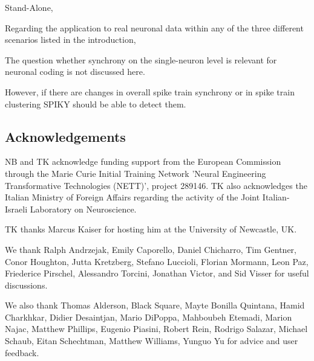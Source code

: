 \documentclass[10pt,twocolumn]{elsart5p}
\begin{document}
Stand-Alone, 

%

Regarding the application to real neuronal data within any of the three different scenarios listed in the introduction,

The question whether synchrony on the single-neuron level is relevant for neuronal coding is not discussed here.

However, if there are changes in overall spike train synchrony or in spike train clustering SPIKY should be able to detect them.


\vspace{1cm}

\begin{thanks}
\section{\label{s:Acknowledgement} \textbf{Acknowledgements}}

NB and TK acknowledge funding support from the European Commission through the Marie Curie Initial Training Network 'Neural Engineering Transformative Technologies (NETT)', project 289146. TK also acknowledges the Italian Ministry of Foreign Affairs regarding the activity of the Joint Italian-Israeli Laboratory on Neuroscience.

TK thanks Marcus Kaiser for hosting him at the University of Newcastle, UK.
     
We thank Ralph Andrzejak, Emily Caporello, Daniel Chicharro, Tim Gentner, Conor Houghton, Jutta Kretzberg, Stefano Luccioli, Florian Mormann, Leon Paz, Friederice Pirschel, Alessandro Torcini, Jonathan Victor, and Sid Visser for useful discussions.

We also thank Thomas Alderson, Black Square, Mayte Bonilla Quintana, Hamid Charkhkar, Didier Desaintjan, Mario DiPoppa, Mahboubeh Etemadi, Marion Najac, Matthew Phillips, Eugenio Piasini, Robert Rein, Rodrigo Salazar, Michael Schaub, Eitan Schechtman, Matthew Williams, Yunguo Yu for advice and user feedback.
\end{thanks}



%
%
\end{document}
